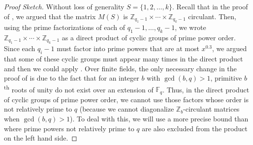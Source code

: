 \documentclass{toc}
\newcommand\F{{\mathbb{F}}}
\renewcommand\Z{{\mathbb{Z}}}
\newcommand{\ts}{\textsuperscript}
\begin{document}
\begin{proof}[Proof Sketch]
Without loss of generality $S = \{1,2, \dots , k \}$.  Recall that in the proof of , we argued that the matrix $M(S)$ is $\Z_{q_1-1} \times \cdots \times \Z_{q_k - 1}$ circulant.  Then, using the prime factorizations of each of $q_1 -1, \dots , q_k - 1$, we wrote $\Z_{q_1-1} \times \cdots \times \Z_{q_k - 1}$ as a direct product of cyclic groups of prime power order.  Since each $q_i - 1$ must factor into prime powers that are at most $x^{0.3}$, we argued that some of these cyclic groups must appear many times in the direct product and then we could apply .  Over finite fields, the only necessary change in the proof of  is due to the fact that for an integer $b$ with $\gcd(b,q) > 1$, primitive $b$\ts{th} roots of unity do not exist over an extension of $\F_q$.  Thus, in the direct product of cyclic groups of prime power order, we cannot use those factors whose order is not relatively prime to $q$ (because we cannot diagonalize $\Z_b$-circulant matrices when $\gcd(b,q) > 1$).  To deal with this, we will use a more precise bound than  where prime powers not relatively prime to $q$ are also excluded from the product on the left hand side.


\end{proof}
\end{document}

